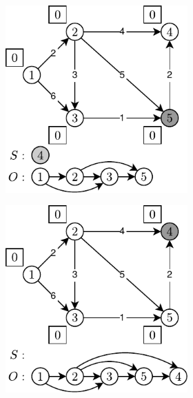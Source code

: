 \begin{figure}[!htbp]
\begin{subfigure}[b]{\textwidth}
\begin{subfigure}[b]{0.3\textwidth}
			\caption{}
			\label{fig:exampleKhan:d}
		\end{subfigure}
		\hfill
		\begin{subfigure}[b]{0.3\textwidth}
			\includegraphics[width=\textwidth]{Chapter_II/KHAN-TOPOLOGICAL-SORT-Example/e.pdf}
			\caption{}
			\label{fig:exampleKhan:e}
		\end{subfigure}
		\hfill
		\begin{subfigure}[b]{0.3\textwidth}
			\includegraphics[width=\textwidth]{Chapter_II/KHAN-TOPOLOGICAL-SORT-Example/f.pdf}

\end{subfigure}
\end{subfigure}
\end{figure}
